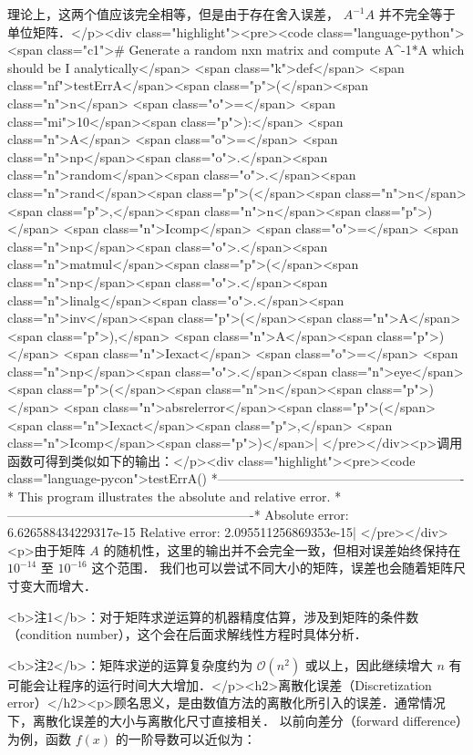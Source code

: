 理论上，这两个值应该完全相等，但是由于存在舍入误差， $A^{-1}A$ 并不完全等于单位矩阵．</p><div class="highlight"><pre><code class="language-python"><span class="c1"># Generate a random nxn matrix and compute A^{-1}*A which should be I analytically</span>
<span class="k">def</span> <span class="nf">testErrA</span><span class="p">(</span><span class="n">n</span> <span class="o">=</span> <span class="mi">10</span><span class="p">):</span>
    <span class="n">A</span> <span class="o">=</span> <span class="n">np</span><span class="o">.</span><span class="n">random</span><span class="o">.</span><span class="n">rand</span><span class="p">(</span><span class="n">n</span><span class="p">,</span><span class="n">n</span><span class="p">)</span>
    <span class="n">Icomp</span> <span class="o">=</span> <span class="n">np</span><span class="o">.</span><span class="n">matmul</span><span class="p">(</span><span class="n">np</span><span class="o">.</span><span class="n">linalg</span><span class="o">.</span><span class="n">inv</span><span class="p">(</span><span class="n">A</span><span class="p">),</span> <span class="n">A</span><span class="p">)</span>
    <span class="n">Iexact</span> <span class="o">=</span> <span class="n">np</span><span class="o">.</span><span class="n">eye</span><span class="p">(</span><span class="n">n</span><span class="p">)</span>
    <span class="n">absrelerror</span><span class="p">(</span><span class="n">Iexact</span><span class="p">,</span> <span class="n">Icomp</span><span class="p">)</span>| </pre></div><p>调用函数可得到类似如下的输出：</p><div class="highlight"><pre><code class="language-pycon">testErrA()
*----------------------------------------------------------*
This program illustrates the absolute and relative error.
*----------------------------------------------------------*
Absolute error: 6.626588434229317e-15
Relative error: 2.095511256869353e-15| </pre></div><p>由于矩阵  $A$  的随机性，这里的输出并不会完全一致，但相对误差始终保持在 $10^{-14}$  至  $10^{-16}$  这个范围． 我们也可以尝试不同大小的矩阵，误差也会随着矩阵尺寸变大而增大．

<b>注1</b>：对于矩阵求逆运算的机器精度估算，涉及到矩阵的条件数（condition number），这个会在后面求解线性方程时具体分析．

<b>注2</b>：矩阵求逆的运算复杂度约为  $\mathcal{O}(n^2)$  或以上，因此继续增大  $n$  有可能会让程序的运行时间大大增加．</p><h2>离散化误差（Discretization error）</h2><p>顾名思义，是由数值方法的离散化所引入的误差．通常情况下，离散化误差的大小与离散化尺寸直接相关． 以前向差分（forward difference）为例，函数  $f(x)$  的一阶导数可以近似为：

